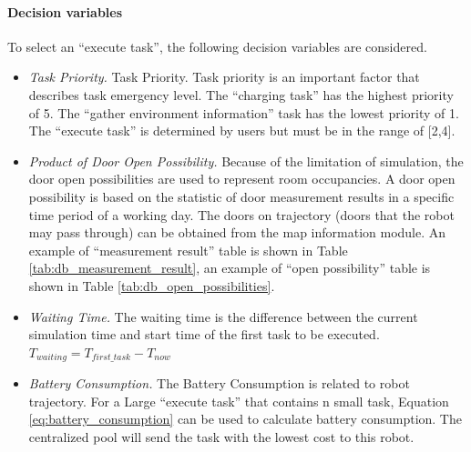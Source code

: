 \paragraph*{Decision variables}
To select an ``execute task'', the following decision variables are considered.
\begin{itemize}
\item \textsl{Task Priority.} Task Priority. Task priority is an important factor that describes task emergency level. The ``charging task'' has the highest priority of 5. The ``gather environment information'' task has the lowest priority of 1. 
	The ``execute task'' is determined by users but must be in the range of [2,4]. 
\item \textsl{Product of Door Open Possibility.} Because of the limitation of simulation, the door open possibilities are used to represent room occupancies. A door open possibility is based on the statistic of door measurement results in a specific time period of a working day. 
	The doors on trajectory (doors that the robot may pass through) can be obtained from the map information module.
	An example of ``measurement result'' table is shown in Table \ref{tab:db_measurement_result}, an example of ``open possibility'' table is shown in Table \ref{tab:db_open_possibilities}. 
\item \textsl{Waiting Time. } The waiting time is the difference between the current simulation time and start time of the first task to be executed. $T_{waiting} = T_{first\_task} - T_{now}$
\item \textsl{Battery Consumption.} The Battery Consumption is related to robot trajectory. For a Large ``execute task'' that contains n small task, Equation \ref{eq:battery_consumption} can be used to calculate battery consumption. The centralized pool will send the task with the lowest cost to this robot.
\end{itemize}


\begin{table}[htb]
\centering
{}
\caption{Door Open Possibility}
\label{tab:db_open_possibilities}
\end{table}


